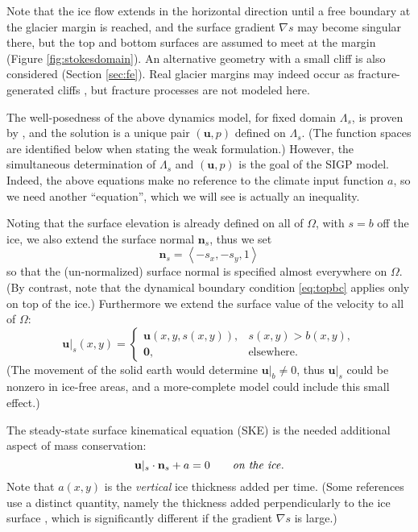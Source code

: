 \documentclass[letterpaper,final,12pt,reqno]{amsart}
\theoremstyle{claim}
\newcommand{\grad}{\nabla}
\newcommand{\bn}{\mathbf{n}}
\newcommand{\bu}{\mathbf{u}}
\newcommand{\bzero}{\bm{0}}
\numberwithin{equation}{section}
\numberwithin{figure}{section}
\numberwithin{table}{section}
\numberwithin{theorem}{section}
\begin{document}
Note that the ice flow extends in the horizontal direction until a free boundary at the glacier margin is reached, and the surface gradient $\grad s$ may become singular there, but the top and bottom surfaces are assumed to meet at the margin (Figure \ref{fig:stokesdomain}).  An alternative geometry with a small cliff is also considered (Section \ref{sec:fe}).  Real glacier margins may indeed occur as fracture-generated cliffs \cite{PralongFunk2005}, but fracture processes are not modeled here.

The well-posedness of the above dynamics model, for fixed domain $\Lambda_s$, is proven by \cite{JouvetRappaz2011}, and the solution is a unique pair $(\bu,p)$ defined on $\Lambda_s$.  (The function spaces are identified below when stating the weak formulation.)  However, the simultaneous determination of $\Lambda_s$ and $(\bu,p)$ is the goal of the SIGP model.  Indeed, the above equations make no reference to the climate input function $a$, so we need another ``equation'', which we will see is actually an inequality.

\newcommand{\bus}{\bu|_s}

Noting that the surface elevation is already defined on all of $\Omega$, with $s=b$ off the ice, we also extend the surface normal $\bn_s$, thus we set
\begin{equation}
\bn_s = \left<-s_x,-s_y,1\right> \label{eq:surfacenormal}
\end{equation}
so that the (un-normalized) surface normal is specified almost everywhere on $\Omega$.  (By contrast, note that the dynamical boundary condition \eqref{eq:topbc} applies only on top of the ice.)  Furthermore we extend the surface value of the velocity to all of $\Omega$:
\begin{equation}
\bus(x,y) = \begin{cases} \bu(x,y,s(x,y)), & s(x,y) > b(x,y), \\
                     \bzero, & \text{elsewhere}. \end{cases} \label{eq:surfacevelocity}
\end{equation}
(The movement of the solid earth would determine $\bu|_b \ne 0$, thus $\bu|_s$ could be nonzero in ice-free areas, and a more-complete model could include this small effect.)

The steady-state surface kinematical equation (SKE) \cite[see equation (5.21)]{GreveBlatter2009} is the needed additional aspect of mass conservation:
\begin{equation}
\bus \cdot \bn_s + a = 0 \qquad \text{\emph{on the ice}}. \label{eq:ske}
\end{equation}
Note that $a(x,y)$ is the \emph{vertical} ice thickness added per time.  (Some references use a distinct quantity, namely the thickness added perpendicularly to the ice surface \cite{GreveBlatter2009}, which is significantly different if the gradient $\grad s$ is large.)
\end{document}
